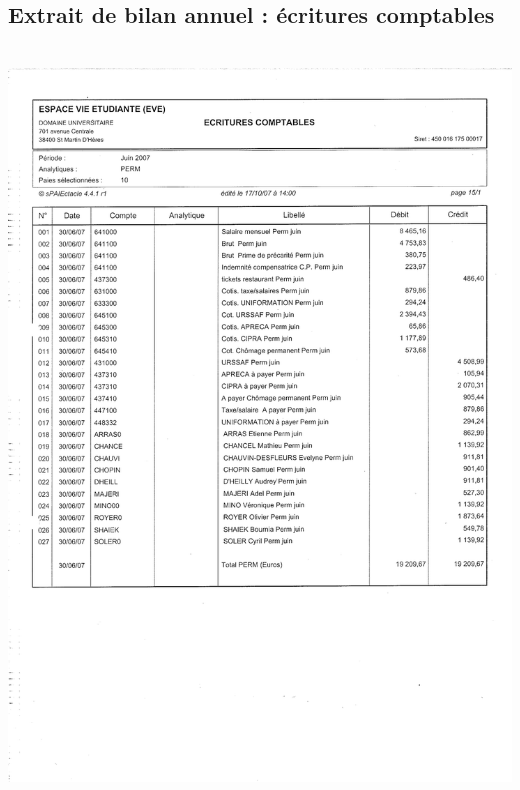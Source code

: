 \subsection{Extrait de bilan annuel : écritures comptables}
\begin{center}
\includegraphics[height=20cm]{annexes/images/bilan_annuel_ecritures_comptables.pdf}
\end{center}
